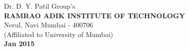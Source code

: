 \begin{center}
{\vspace{0.6in}
\small Dr. D. Y. Patil Group's \\
\vspace{0.1in}
\textbf {RAMRAO ADIK INSTITUTE OF TECHNOLOGY}\\
\vspace{0.1in}
\small Nerul, Navi Mumbai - 400706\\
\vspace{0.1in}
\small (Affiliated to University of Mumbai)\\
\vspace{0.1in}
\small  \textbf {Jan 2015}










}
\end{center}
